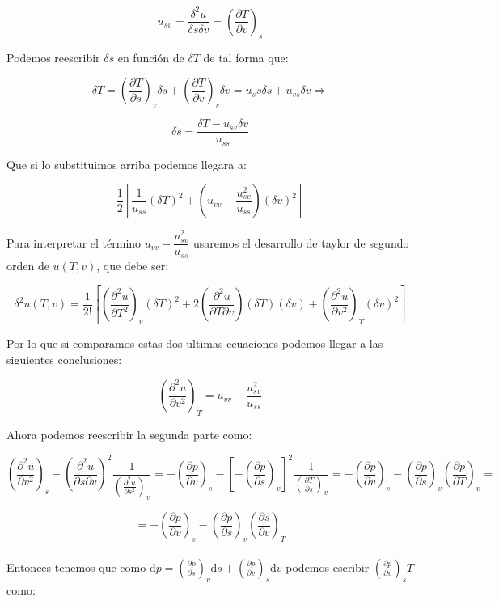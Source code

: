\documentclass[12pt,a4paper]{article}
\newcommand{\D}{\mathrm{d}}
\newcommand{\parentesis}[1]{\left( #1 \right)}
\newcommand{\parcialesnormales}[2]{\parentesis{\parciales{ #1}{#2 }}}
\newcommand{\parcialesdobles}[2]{\parentesis{\parciales{^2 #1}{#2 ^2}}}
\newcommand{\parcialescruzadas}[3]{\parentesis{\parciales{^2 #1}{#2 \partial #3}}}
\newcommand{\parciales}[2]{\frac{\partial #1}{\partial #2}}
\begin{document}
$$ u_ {sv} = \dfrac{\delta^2 u}{\delta s \delta v} = \parentesis{\parciales{T}{v}}_s $$

Podemos reescribir $\delta s$ en función de $\delta T$ de tal forma que:

$$ \delta T = \parentesis{\parciales{T}{s}}_{v} \delta s + \parentesis{\parciales{T}{v}}_{s} \delta v = u_ss \delta s + u_{vs} \delta v  \Longrightarrow $$

\begin{equation}
\delta s = \dfrac{\delta T - u_{sv} \delta v}{u_{ss}}
\end{equation}

Que si lo substituimos arriba podemos llegara a:

\begin{equation}
\dfrac{1}{2} \left[  \dfrac{1}{u_{ss}} (\delta T)^2 + \left( u_{vv} - \dfrac{u_{sv}^2}{u_{ss}} \right)  (\delta v)^2  \right]
\end{equation}

Para interpretar el término $ u_{vv} - \dfrac{u_{sv}^2}{u_{ss}}$  usaremos el desarrollo de taylor de segundo orden de $u(T,v)$, que debe ser:

\begin{equation}
\delta^2 u(T,v) = \dfrac{1}{2!} \left[  \parentesis{\parciales{^2 u}{T^2}}_v (\delta T)^2 + 2 \parentesis{\parciales{^2 u}{T \partial v}} (\delta T) (\delta v) + \parentesis{\parciales{^2 u}{v^2}}_T (\delta v)^2  \right]
\end{equation}

Por lo que si comparamos estas dos ultimas ecuaciones podemos llegar a las siguientes conclusiones:

$$ \parentesis{\parciales{^2 u}{v^2}}_T = u_{vv} - \dfrac{u^2_{sv}}{u_{ss}} $$

Ahora podemos reescribir la segunda parte como:

$$ \parcialesdobles{u}{v}_s - \parcialescruzadas{u}{s}{v}^2 \dfrac{1}{\parcialesdobles{u}{s}_v} = - \parentesis{\parciales{p}{v}}_s - \left[ -\parcialesnormales{p}{s}_v \right]^2 \dfrac{1}{\parcialesnormales{T}{s}_v} =   - \parentesis{\parciales{p}{v}}_s - \parcialesnormales{p}{s}_v  \parcialesnormales{p}{T}_v =$$

$$ = - \parentesis{\parciales{p}{v}}_s - \parcialesnormales{p}{s}_v  \parcialesnormales{s}{v}_T  $$ \\


Entonces tenemos que como $\D p = \parcialesnormales{p}{s}_v \D s + \parcialesnormales{p}{v}_s \D v$ podemos escribir $\parcialesnormales{p}{v}_sT$ como:
\end{document}

